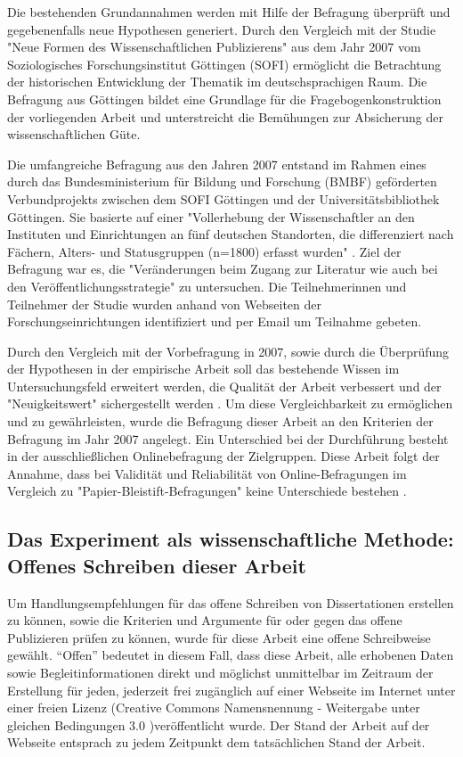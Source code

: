 Die bestehenden Grundannahmen werden mit Hilfe der Befragung überprüft und gegebenenfalls neue Hypothesen generiert. Durch den Vergleich mit der Studie "Neue Formen des Wissenschaftlichen Publizierens" aus dem Jahr 2007 vom Soziologisches Forschungsinstitut Göttingen (SOFI) ermöglicht die Betrachtung der historischen Entwicklung der Thematik im deutschsprachigen Raum. Die Befragung aus Göttingen bildet eine Grundlage für die Fragebogenkonstruktion der vorliegenden Arbeit und unterstreicht die Bemühungen zur Absicherung der wissenschaftlichen Güte.

Die umfangreiche Befragung aus den Jahren 2007 entstand im Rahmen eines durch das Bundesministerium für Bildung und Forschung (BMBF) geförderten Verbundprojekts zwischen dem SOFI Göttingen und der Universitätsbibliothek Göttingen. Sie basierte auf einer "Vollerhebung der Wissenschaftler an den Instituten und Einrichtungen an fünf deutschen Standorten, die differenziert nach Fächern, Alters- und Statusgruppen (n=1800) erfasst wurden" \cite{Hanekop_2014}. Ziel der Befragung war es, die "Veränderungen beim Zugang zur Literatur wie auch bei den Veröffentlichungsstrategie" \cite{Hanekop_Wittke_2007_Fragebogen} zu untersuchen. Die Teilnehmerinnen und Teilnehmer der Studie wurden anhand von Webseiten der Forschungseinrichtungen identifiziert und per Email um Teilnahme gebeten.

Durch den Vergleich mit der Vorbefragung in 2007, sowie durch die Überprüfung der Hypothesen in der empirische Arbeit soll das bestehende Wissen im Untersuchungsfeld erweitert werden, die Qualität der Arbeit verbessert und der "Neuigkeitswert" sichergestellt werden \cite{raab_2012_fragebogen}. Um diese Vergleichbarkeit zu ermöglichen und zu gewährleisten, wurde die Befragung dieser Arbeit an den Kriterien der Befragung im Jahr 2007 angelegt. Ein Unterschied bei der Durchführung besteht in der ausschließlichen Onlinebefragung der Zielgruppen. Diese Arbeit folgt der Annahme, dass bei Validität und Reliabilität von Online-Befragungen im Vergleich zu "Papier-Bleistift-Befragungen" keine Unterschiede bestehen \cite{Batinic_2013_onlinebefrag}.

\subsection{Das Experiment als wissenschaftliche Methode: Offenes Schreiben dieser Arbeit}

Um Handlungsempfehlungen für das offene Schreiben von Dissertationen erstellen zu können, sowie die Kriterien und Argumente für oder gegen das offene Publizieren prüfen zu können, wurde für diese Arbeit eine offene Schreibweise gewählt. “Offen” bedeutet in diesem Fall, dass diese Arbeit, alle erhobenen Daten sowie Begleitinformationen direkt und möglichst unmittelbar im Zeitraum der Erstellung für jeden, jederzeit frei zugänglich auf einer Webseite im Internet unter einer freien Lizenz (Creative Commons Namensnennung - Weitergabe unter gleichen Bedingungen 3.0 \cite{cc_by_sa_2008})veröffentlicht wurde. Der Stand der Arbeit auf der Webseite entsprach zu jedem Zeitpunkt dem tatsächlichen Stand der Arbeit.

